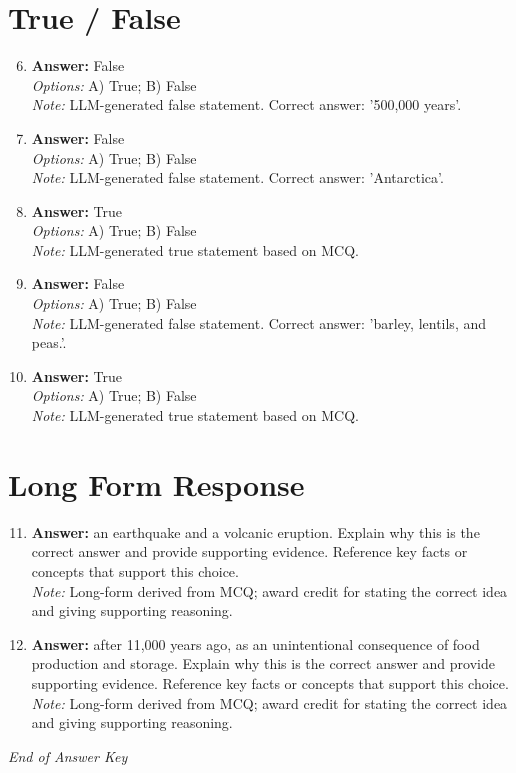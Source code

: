 \documentclass[12pt]{article}
\begin{document}
\section*{True / False}
\begin{enumerate}[label=\arabic*.]
\setcounter{enumi}{5}
\item \textbf{Answer:} False
\\ \textit{Options:} A) True; B) False
\\ \textit{Note:} LLM-generated false statement. Correct answer: '500,000 years'.
\item \textbf{Answer:} False
\\ \textit{Options:} A) True; B) False
\\ \textit{Note:} LLM-generated false statement. Correct answer: 'Antarctica'.
\item \textbf{Answer:} True
\\ \textit{Options:} A) True; B) False
\\ \textit{Note:} LLM-generated true statement based on MCQ.
\item \textbf{Answer:} False
\\ \textit{Options:} A) True; B) False
\\ \textit{Note:} LLM-generated false statement. Correct answer: 'barley, lentils, and peas.'.
\item \textbf{Answer:} True
\\ \textit{Options:} A) True; B) False
\\ \textit{Note:} LLM-generated true statement based on MCQ.
\end{enumerate}

\section*{Long Form Response}
\begin{enumerate}[label=\arabic*.]
\setcounter{enumi}{10}
\item \textbf{Answer:} an earthquake and a volcanic eruption. Explain why this is the correct answer and provide
supporting evidence. Reference key facts or concepts that support this choice.
\\ \textit{Note:} Long-form derived from MCQ; award credit for stating the correct idea and giving supporting reasoning.
\item \textbf{Answer:} after 11,000 years ago, as an unintentional consequence of food production and storage.
Explain why this is the correct answer and provide supporting evidence. Reference key
facts or concepts that support this choice.
\\ \textit{Note:} Long-form derived from MCQ; award credit for stating the correct idea and giving supporting reasoning.
\end{enumerate}

\vfill
\noindent\textit{End of Answer Key}
\end{document}
